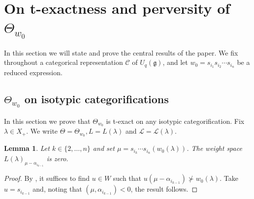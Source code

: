 \documentclass[11pt,reqno]{amsart}
\numberwithin{equation}{section}
\newtheorem{Lemma}[equation]{Lemma}
\theoremstyle{definition}
\theoremstyle{named}
\newcommand{\cC}{\mathcal{C}}
\newcommand{\cL}{\mathcal{L}}
\newcommand{\fg}{\mathfrak{g}}
\begin{document}



\section{On t-exactness and perversity of $\Theta_{w_0}$}

In this section we will state and prove the central results of the paper.  We fix throughout a categorical representation $\cC$ of  $U_q(\fg)$, and let $w_0=s_{i_1}s_{i_2} \cdots s_{i_n}$ be a reduced expression.




\subsection{$\Theta_{w_0}$ on isotypic categorifications}	In this section we prove that $\Theta_{w_0}$ is t-exact on any isotypic categorification.  Fix $\lambda \in X_+$.  We write $\Theta=\Theta_{w_0}, L=L(\lambda)$ and $\cL=\cL(\lambda)$.

\begin{Lemma}\label{lem:techbit}
Let $k\in\{2,\hdots,n\}$ and set $\mu=s_{i_k}\cdots s_{i_n}(w_0(\lambda))$.  The weight space $L(\lambda)_{\mu-\alpha_{i_{k-1}}}$ is zero.
\end{Lemma}

\begin{proof}
By \cite[Proposition 21.3]{Humph}, it suffices to find $u\in W$ such that $u(\mu-\alpha_{i_{k-1}}) \nsucc w_0(\lambda)$.  Take $u=s_{i_{k-1}}$ and, noting that $(\mu,\alpha_{i_{k-1}})<0$, the result follows.
\end{proof}
\end{document}
